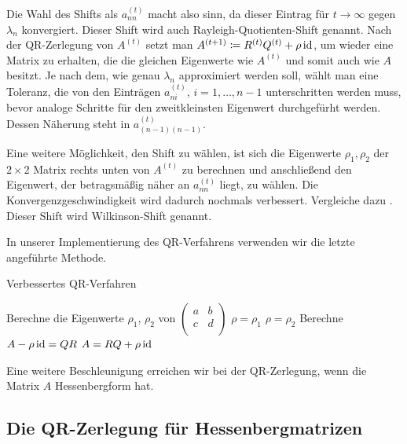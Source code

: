 \documentclass{article}
\begin{document}
Die Wahl des Shifts als $a^{(t)}_{nn}$ macht also sinn, da dieser Eintrag für $t \rightarrow \infty$ gegen $\lambda_n$ konvergiert. Dieser Shift wird auch Rayleigh-Quotienten-Shift genannt. Nach der QR-Zerlegung von $A^{(t)}$ setzt man $A^{(t+1)} \coloneqq R^{(t)}Q^{(t)} + \rho \operatorname{id}$, um wieder eine Matrix zu erhalten, die die gleichen Eigenwerte wie $A^{(t)}$ und somit auch wie $A$ besitzt.
Je nach dem, wie genau $\lambda_n$ approximiert werden soll, wählt man eine Toleranz, die von den Einträgen $a^{(t)}_{ni}, \, i = 1,\dots, n-1$ unterschritten werden muss, bevor analoge Schritte für den zweitkleinsten Eigenwert durchgefürht werden. Dessen Näherung steht in $a^{(t)}_{(n-1)(n-1)}$.

Eine weitere Möglichkeit, den Shift zu wählen, ist sich die Eigenwerte $\rho_1, \rho_2$ der $2 \times 2$ Matrix rechts unten von $A^{(t)}$ zu berechnen und anschließend den Eigenwert, der betragsmäßig näher an $a^{(t)}_{nn}$ liegt, zu wählen. Die Konvergenzgeschwindigkeit wird dadurch nochmals verbessert. Vergleiche dazu \cite{Nannen-Skript}. Dieser Shift wird Wilkinson-Shift genannt. 

In unserer Implementierung des QR-Verfahrens verwenden wir die letzte angeführte Methode.

\begin{algorithm}
	\label{QR-Verfahren_shifts}
	\caption{Verbessertes QR-Verfahren}
	\begin{algorithmic}[1]
		\State Berechne die Eigenwerte $\rho_1$, $\rho_2$ von $\left(\begin{array}{rr}
			a&b\\
			c&d\\
		\end{array}\right)$
		\State $\rho = \rho_1$
		\Else
		\State $\rho = \rho_2$
		\EndIf
		\State Berechne $A - \rho \operatorname{id} = QR$
		\State $A = RQ + \rho \operatorname{id}$
		\EndWhile
		\EndFor
	\end{algorithmic}
\end{algorithm}

Eine weitere Beschleunigung erreichen wir bei der QR-Zerlegung, wenn die Matrix $A$ Hessenbergform hat.

\subsection{Die QR-Zerlegung für Hessenbergmatrizen}
\end{document}
